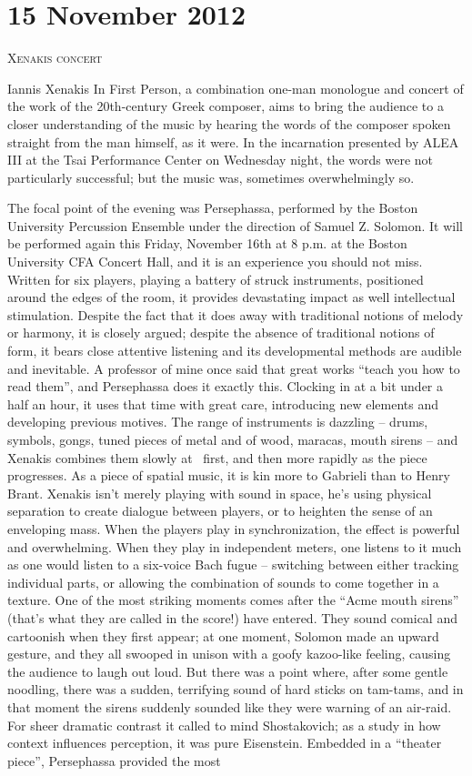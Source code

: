 \chapter{15 November 2012}

\textsc{Xenakis concert}

Iannis Xenakis In First Person, a combination one-man monologue and concert of the work of the 20th-century Greek composer, aims to bring the audience to a closer understanding of the music by hearing the words of the composer spoken straight from the man himself, as it were. In the incarnation presented by ALEA III at the Tsai Performance Center on Wednesday night, the words were not particularly successful; but the music was, sometimes overwhelmingly so.

The focal point of the evening was Persephassa, performed by the Boston University Percussion Ensemble under the direction of Samuel Z. Solomon. It will be performed again this Friday, November 16th at 8 p.m. at the Boston University CFA Concert Hall, and it is an experience you should not miss. Written for six players, playing a battery of struck instruments, positioned around the edges of the room, it provides devastating impact as well intellectual stimulation. Despite the fact that it does away with traditional notions of melody or harmony, it is closely argued; despite the absence of traditional notions of form, it bears close attentive listening and its developmental methods are audible and inevitable. A professor of mine once said that great works “teach you how to read them”, and Persephassa does it exactly this. Clocking in at a bit under a half an hour, it uses that time with great care, introducing new elements and developing previous motives. The range of instruments is dazzling -- drums, symbols, gongs, tuned pieces of metal and of wood, maracas, mouth sirens – and Xenakis combines them slowly at  first, and then more rapidly as the piece progresses. As a piece of spatial music, it is kin more to Gabrieli than to Henry Brant. Xenakis isn’t merely playing with sound in space, he’s using physical separation to create dialogue between players, or to heighten the sense of an enveloping mass. When the players play in synchronization, the effect is powerful and overwhelming. When they play in independent meters, one listens to it much as one would listen to a six-voice Bach fugue – switching between either tracking individual parts, or allowing the combination of sounds to come together in a texture. One of the most striking moments comes after the “Acme mouth sirens” (that’s what they are called in the score!) have entered. They sound comical and cartoonish when they first appear; at one moment, Solomon made an upward gesture, and they all swooped in unison with a goofy kazoo-like feeling, causing the audience to laugh out loud. But there was a point where, after some gentle noodling, there was a sudden, terrifying sound of hard sticks on tam-tams, and in that moment the sirens suddenly sounded like they were warning of an air-raid. For sheer dramatic contrast it called to mind Shostakovich; as a study in how context influences perception, it was pure Eisenstein. Embedded in a “theater piece”, Persephassa provided the most 
